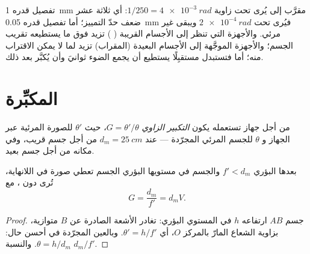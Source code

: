 \begin{remark}\label{rem:b1:optical-instruments:purpose}
تفصيل قدره \qty{1}{mm} مقرَّب إلى  يُرى تحت زاوية $1/250 =
\qty{4e-3}{rad}$: أي ثلاثة عشر ضعف حدّ التمييز؛ أما تفصيل قدره \qty{0.05}{mm}
فيُرى تحت $\qty{2e-4}{rad}$ ويبقى غير مرئي. والأجهزة التي
تنظر إلى الأجسام القريبة ( ) تزيد 
فوق ما يستطيعه تقريب الجسم؛ والأجهزة الموجَّهة إلى الأجسام البعيدة
(المقراب) تزيد  لما لا يمكن الاقتراب منه؛
أما  فتستبدل  مستقبِلًا يستطيع أن يجمع
الضوء ثوانيَ وأن يُكبَّر بعد ذلك.
\end{remark}

\section{المكبِّرة}

\begin{definition}\label{def:b1:optical-instruments:G}
من أجل جهاز تستعمله  يكون \emph{التكبير الزاوي}
$G = \theta'/\theta$، حيث $\theta'$  للصورة
المرئية عبر الجهاز و $\theta$  للجسم
المرئي  المجرّدة --- عند  $d_m = \qty{25}{cm}$ من
أجل جسم قريب، وفي مكانه من أجل جسم بعيد.
\end{definition}

\begin{proposition}[المكبِّرة]\label{prop:b1:optical-instruments:loupe}
 بعدها البؤري $f' < d_m$ والجسم في مستويها
البؤري الجسم تعطي صورة في اللانهاية، تُرى دون
، مع
\[
G = \frac{d_m}{f'} = d_m V .
\]
\end{proposition}

\begin{proof}
جسم $AB$ ارتفاعه $h$ في المستوي البؤري: تغادر الأشعة الصادرة عن $B$
متوازية، بزاوية الشعاع المارّ بالمركز $O$، أي $\theta' = h/f'$. وبالعين
المجرّدة في أحسن حال: $\theta = h/d_m$. والنسبة $d_m/f'$.
\end{proof}


